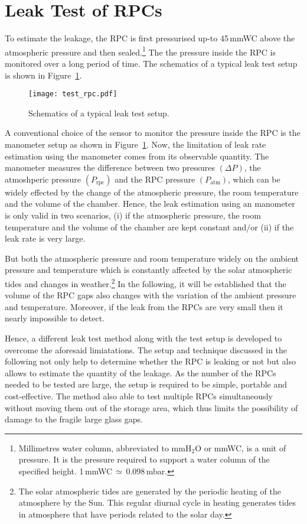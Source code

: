 \section{Leak Test of RPCs}
To estimate the leakage, the RPC is first pressurised up-to 45\,mmWC above the atmospheric pressure and then sealed.\footnote{Millimetres water column, abbreviated to mmH$_2$O or mmWC, is a unit of pressure. It is the pressure required to support a water column of the specified height. 1\,mmWC\,$\simeq$\,0.098\,mbar.} The the pressure inside the RPC is monitored over a long period of time. The schematics of a typical leak test setup is shown in Figure~\ref{fig:test_rpc}. 
\begin{figure}
  \centering
  \texttt{[image: test\_rpc.pdf]}
  \caption{Schematics of a typical leak test setup.}
  \label{fig:test_rpc}
\end{figure}
A conventional choice of the sensor to monitor the pressure inside the RPC is the manometer setup as shown in Figure~\ref{fig:test_rpc}. Now, the limitation of leak rate estimation using the manometer comes from its observable quantity. The manometer measures the difference between two pressures $\left(\Delta P\right)$, the atmoshperic pressure $\left(P_{\mathrm{rpc}}\right)$ and the RPC pressure $\left(P_{\mathrm{atm}}\right)$, which can be widely effected by the change of the atmospheric pressure, the room temperature and the volume of the chamber. Hence, the leak estimation using an manometer is only valid in two scenarios, (i) if the atmospheric pressure, the room temperature and the volume of the chamber are kept constant and/or (ii) if the leak rate is very large.

But both the atmospheric pressure and room temperature widely on the ambient pressure and temperature which is constantly affected by the solar atmospheric tides and changes in weather.\footnote{The solar atmospheric tides are generated by the periodic heating of the atmosphere by the Sun. This regular diurnal cycle in heating generates tides in atmosphere that have periods related to the solar day.} In the following, it will be established that the volume of the RPC gaps also changes with the variation of the ambient pressure and temperature. Moreover, if the leak from the RPCs are very small then it nearly impossible to detect.

Hence, a different leak test method along with the test setup is developed to overcome the aforesaid limiatations. The setup and technique discussed in the following not only help to determine whether the RPC is leaking or not but also allows to estimate the quantity of the leakage. As the number of the RPCs needed to be tested are large, the setup is required to be simple, portable and cost-effective. The method also able to test multiple RPCs simultaneously without moving them out of the storage area, which thus limits the possibility of damage to the fragile large glass gaps.

